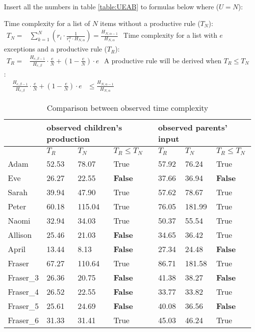 Insert all the numbers in table \ref{table:UEAB} to formulas below where ($U = N$):
\begin{exe}
\ex \label{newTN}Time complexity for a list of $N$ items without a productive rule ($T_N$):\\
$\begin{aligned}
T_N = & {\displaystyle\sum_{k=1}^N(r_i\cdot\frac{1}{r_i^\alpha\cdot H_{N,\alpha}})} = \frac{H_{N,\alpha-1}}{H_{N,\alpha}}
\end{aligned}$
\ex \label{newTR}Time complexity for a list with $e$ exceptions and a productive rule ($T_R$):\\
$\begin{aligned}
T_R = & \frac{H_{e,\beta-1}}{H_{e,\beta}}\cdot\frac{e}{N} + (1-\frac{e}{N})\cdot e
\end{aligned}$
\ex \label{newTP}A productive rule will be derived when $T_R \leq T_N$:\\
$\begin{aligned}
& \frac{H_{e,\beta-1}}{H_{e,\beta}}\cdot\frac{e}{N} + (1-\frac{e}{N})\cdot e & \leq  \frac{H_{N,\alpha-1}}{H_{N,\alpha}}
\end{aligned}$
\end{exe}
\begin{table}[htb]
\centering
\label{table:TRTNTR<TN}
\caption{Comparison between observed time complexity}
\begin{tabular}{llll|lll}
\toprule
 & \multicolumn{3}{l}{observed children's production} & \multicolumn{3}{l}{observed parents' input} \\
 \hline
 & $T_R$ & $T_N$ & $T_R \leq T_N$ & $T_R$ & $T_N$ & $T_R \leq T_N$ \\
Adam & 52.53 & 78.07 & True & 57.92 & 76.24 & True \\
Eve & 26.27 & 22.55 & \textbf{False} & 37.66 & 36.94 & \textbf{False} \\
Sarah & 39.94 & 47.90 & True & 57.62 & 78.67 & True \\
Peter & 60.18 & 115.04 & True & 76.05 & 181.99 & True \\
Naomi & 32.94 & 34.03 & True & 50.37 & 55.54 & True \\
Allison & 25.46 & 21.03 & \textbf{False} & 34.65 & 36.42 & True \\
April & 13.44 & 8.13 & \textbf{False} & 27.34 & 24.48 & \textbf{False} \\
Fraser & 67.27 & 110.64 & True & 86.71 & 181.58 & True\\
\bottomrule
\bottomrule
Fraser_3 & 26.36 & 20.75 & \textbf{False} & 41.38 & 38.27 & \textbf{False}\\
Fraser_4 & 26.52 & 22.55 & \textbf{False} & 33.77 & 33.82 & True\\
Fraser_5 & 25.61 & 24.69 & \textbf{False} & 40.08 & 36.56 & \textbf{False}\\
Fraser_6 & 31.33 & 31.41 & True & 45.03 & 46.24 & True\\
\bottomrule
\end{tabular}
\end{table}

